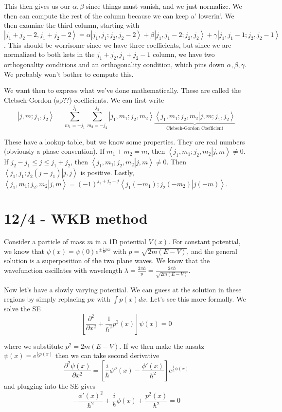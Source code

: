 \documentclass[10pt]{report}
\newcommand{\ket}[1]{\left|#1\right>}
\newcommand{\dotp}[2]{\left<#1\left.\right|#2\right>}
\newcommand{\ptd}[2]{\frac{\partial^2 #1}{\partial#2^2}}
\begin{document}
This then gives us our $\alpha,\beta$ since things must vanish, and we just normalize. We then can compute the rest of the column because we can keep a' lowerin'. We then examine the third column, starting with $\ket{j_1 + j_2 - 2, j_1 + j_2 - 2} = \alpha\ket{j_1, j_1; j_2, j_2 - 2} + \beta \ket{j_1, j_1 - 2; j_2, j_2} + \gamma\ket{j_1, j_1 - 1; j_2, j_2 - 1}$. This should be worrisome since we have three coefficients, but since we are normalized to both kets in the $j_1 + j_2, j_1 + j_2 - 1$ column, we have two orthogonality conditions and an orthogonality condition, which pins down $\alpha,\beta,\gamma$. We probably won't bother to compute this.

We want then to express what we've done mathematically. These are called the Clebsch-Gordon (sp??) coefficients. We can first write
$$\ket{j, m; j_1, j_2} = \sum_{m_1=-j_1}^{j_1} \sum_{m_2=-j_2}^{j_2} \ket{j_1, m_1; j_2, m_2}\underbrace{\dotp{j_1, m_1; j_2, m_2}{j, m;j_1, j_2}}_{\text{Clebsch-Gordon Coefficient}}$$

These have a lookup table, but we know some properties. They are real numbers (obviously a phase convention). If $m_1 + m_2 = m$, then $\dotp{j_1, m_1; j_2, m_2}{j,m} \neq 0$. If $j_2 - j_1 \leq j \leq j_1 + j_2$, then $\dotp{j_1, m_1; j_2, m_2}{j,m} \neq 0$. Then $\dotp{j_1, j_1; j_2(j-j_1)}{j,j}$ is positive. Lastly, $\dotp{j_1, m_1; j_2, m_2}{j,m} = (-1)^{j_1 + j_2 - j}\dotp{j_1(-m_1); j_2(-m_2)}{j(-m)}$.
\chapter{12/4 - WKB method}

Consider a particle of mass $m$ in a 1D potential $V(x)$. For constant potential, we know that $\psi(x) = \psi(0) e^{\pm \frac{i}{\hbar}px}$ with $p = \sqrt{2m(E-V)}$, and the general solution is a superposition of the two plane waves. We know that the wavefunction oscillates with wavelength $\lambda = \frac{2\pi \hbar}{p} = \frac{2\pi \hbar}{\sqrt{2m(E-V)}}$.

Now let's have a slowly varying potential. We can guess at the solution in these regions by simply replacing $px$ with $\int p(x) dx$. Let's see this more formally. We solve the SE
$$\left[\ptd{}{x} + \frac{1}{\hbar^2}p^2(x)\right]\psi(x) = 0$$

where we substitute $p^2 = 2m(E-V)$. If we then make the ansatz $\psi(x) = e^{\frac{i}{\hbar}p(x)}$ then we can take second derivative
$$\ptd{\psi(x)}{x} = \left[ \frac{i}{\hbar}\phi''(x) - \frac{\phi'(x)}{\hbar^2} \right]e^{\frac{i}{\hbar}\phi(x)}$$
and plugging into the SE gives
$$-\frac{\phi'(x)^2}{\hbar^2} + \frac{i}{\hbar}\phi(x) + \frac{p^2(x)}{\hbar^2} = 0$$
\end{document}
